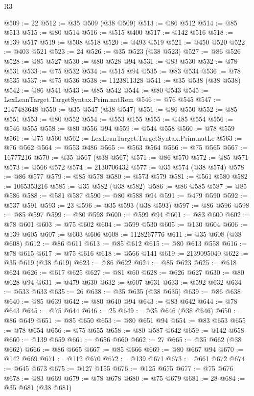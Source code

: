 \begin{lexlean}{R3}
\begin{coremodule}
@509 := 22
@512 := @35 @509 (@38 @509)
@513 := @86 @512
@514 := @85 @513
@515 := @80 @514
@516 := @515 @400
@517 := @142 @516
@518 := @139 @517
@519 := @508 @518
@520 := @493 @519
@521 := @450 @520
@522 := @403 @521
@523 := 24
@526 := @35 @523 (@38 @523)
@527 := @86 @526
@528 := @85 @527
@530 := @80 @528 @94
@531 := @83 @530
@532 := @78 @531
@533 := @75 @532
@534 := @515 @94
@535 := @83 @534
@536 := @78 @535
@537 := @75 @536
@538 := 1123811328
@541 := @35 @538 (@38 @538)
@542 := @86 @541
@543 := @85 @542
@544 := @80 @543
@545 := LexLeanTarget.TargetSyntax.Prim.natRem
@546 := @76 @545
@547 := 2147483648
@550 := @35 @547 (@38 @547)
@551 := @86 @550
@552 := @85 @551
@553 := @80 @552
@554 := @553 @155
@555 := @485 @554
@556 := @546 @555
@558 := @80 @556 @94
@559 := @544 @558
@560 := @78 @559
@561 := @75 @560
@562 := LexLeanTarget.TargetSyntax.Prim.natLe
@563 := @76 @562
@564 := @553 @486
@565 := @563 @564
@566 := @75 @565
@567 := 16777216
@570 := @35 @567 (@38 @567)
@571 := @86 @570
@572 := @85 @571
@573 := @566 @572
@574 := 2130706432
@577 := @35 @574 (@38 @574)
@578 := @86 @577
@579 := @85 @578
@580 := @573 @579
@581 := @561 @580
@582 := 1065353216
@585 := @35 @582 (@38 @582)
@586 := @86 @585
@587 := @85 @586
@588 := @581 @587
@590 := @80 @588 @94
@591 := @479 @590
@592 := @537 @591
@593 := 23
@596 := @35 @593 (@38 @593)
@597 := @86 @596
@598 := @85 @597
@599 := @80 @598
@600 := @599 @94
@601 := @83 @600
@602 := @78 @601
@603 := @75 @602
@604 := @599 @530
@605 := @130 @604
@606 := @139 @605
@607 := @603 @606
@608 := 1128267776
@611 := @35 @608 (@38 @608)
@612 := @86 @611
@613 := @85 @612
@615 := @80 @613 @558
@616 := @78 @615
@617 := @75 @616
@618 := @566 @141
@619 := 2139095040
@622 := @35 @619 (@38 @619)
@623 := @86 @622
@624 := @85 @623
@625 := @618 @624
@626 := @617 @625
@627 := @81 @60
@628 := @626 @627
@630 := @80 @628 @94
@631 := @479 @630
@632 := @607 @631
@633 := @592 @632
@634 := @533 @633
@635 := 26
@638 := @35 @635 (@38 @635)
@639 := @86 @638
@640 := @85 @639
@642 := @80 @640 @94
@643 := @83 @642
@644 := @78 @643
@645 := @75 @644
@646 := 25
@649 := @35 @646 (@38 @646)
@650 := @86 @649
@651 := @85 @650
@653 := @80 @651 @94
@654 := @83 @653
@655 := @78 @654
@656 := @75 @655
@658 := @80 @587 @642
@659 := @142 @658
@660 := @139 @659
@661 := @656 @660
@662 := 27
@665 := @35 @662 (@38 @662)
@666 := @86 @665
@667 := @85 @666
@669 := @80 @667 @94
@670 := @142 @669
@671 := @112 @670
@672 := @139 @671
@673 := @661 @672
@674 := @645 @673
@675 := @127 @155
@676 := @125 @675
@677 := @75 @676
@678 := @83 @669
@679 := @78 @678
@680 := @75 @679
@681 := 28
@684 := @35 @681 (@38 @681)

\end{coremodule}
\end{lexlean}
